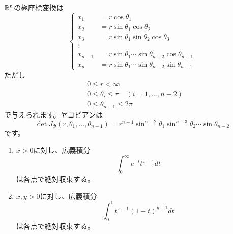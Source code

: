 \documentclass[report]{jlreq}
\begin{document}
\begin{example*}[$n$次元極座標変換]
    $\mathbb{R}^n$の極座標変換は
    \begin{equation}
        \begin{cases}
            x_1 &= r \cos \theta_1 \\
            x_2 &= r \sin \theta_1 \cos \theta_2 \\
            x_3 &= r \sin \theta_1 \sin \theta_2 \cos \theta_3 \\
            \vdots \\
            x_{n-1} &= r \sin \theta_1 \cdots \sin \theta_{n-2} \cos \theta_{n-1} \\
            x_{n} &= r \sin \theta_1 \cdots \sin \theta_{n-2} \sin \theta_{n-1}
        \end{cases}
    \end{equation}
    ただし
    \begin{equation}
        \begin{split}
            &0 \le r < \infty \\
            &0 \le \theta_i \le \pi \quad (i = 1, \dots, n - 2) \\
            &0 \le \theta_{n-1} \le 2\pi
        \end{split}
    \end{equation}
    で与えられます。ヤコビアンは
    \begin{equation}
        \det J_\Phi(r, \theta_1, \dots, \theta_{n-1})
            = r^{n-1} \sin^{n-2} \theta_1 \sin^{n-3} \theta_2 \cdots \sin \theta_{n-2}
    \end{equation}
    です。
\end{example*}

\begin{theorem}
    \begin{enumerate}
        \item $x > 0$に対し、広義積分
            \begin{equation}
                \int_0^\infty e^{-t} t^{x - 1} dt
            \end{equation}
            は各点で絶対収束する。
        \item $x, y > 0$に対し、広義積分
            \begin{equation}
                \int_0^1 t^{x - 1} (1 - t)^{y - 1} dt
            \end{equation}
            は各点で絶対収束する。
    \end{enumerate}
    \label{11:thm:1}
\end{theorem}
\end{document}
